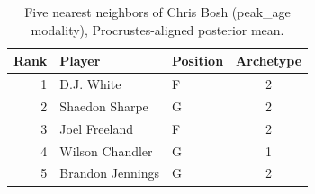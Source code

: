 \begin{table}[htbp]
  \centering\small
  \begin{tabular}{rllc}
    \toprule
    Rank & Player & Position & Archetype \\
    \midrule
    1 & D.J. White & F & 2 \\
    2 & Shaedon Sharpe & G & 2 \\
    3 & Joel Freeland & F & 2 \\
    4 & Wilson Chandler & G & 1 \\
    5 & Brandon Jennings & G & 2 \\
    \bottomrule
  \end{tabular}
  \caption{Five nearest neighbors of Chris Bosh (peak_age modality), Procrustes-aligned posterior mean.}
  \label{tab:Chris_Bosh_neighbors_peak_age}
\end{table}

